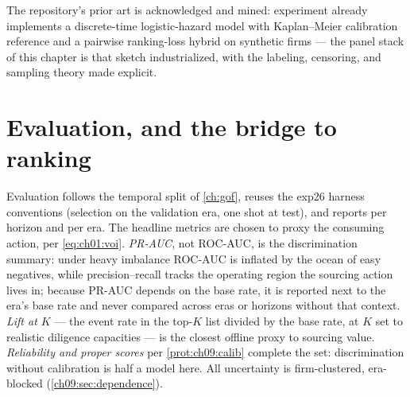 The repository's prior art is acknowledged and mined: experiment
 already implements a discrete-time logistic-hazard model
with Kaplan--Meier calibration reference and a pairwise ranking-loss
hybrid on synthetic firms --- the panel stack of this chapter is that
sketch industrialized, with the labeling, censoring, and sampling theory
made explicit.

\section{Evaluation, and the bridge to ranking}\label{ch09:sec:eval}

Evaluation follows the temporal split of \cref{ch:gof}, reuses the exp26
harness conventions (selection on the validation era, one shot at test),
and reports per horizon and per era. The headline metrics are chosen to
proxy the consuming action, per \cref{eq:ch01:voi}. \emph{PR-AUC}, not
ROC-AUC, is the discrimination summary: under heavy imbalance ROC-AUC is
inflated by the ocean of easy negatives, while precision--recall tracks
the operating region the sourcing action lives in; because PR-AUC
depends on the base rate, it is reported next to the era's base rate
and never compared across eras or horizons without that context.
\emph{Lift at $K$} --- the event rate in the top-$K$ list divided by the
base rate, at $K$ set to realistic diligence capacities --- is the
closest offline proxy to sourcing value. \emph{Reliability and proper
scores} per \cref{prot:ch09:calib} complete the set: discrimination
without calibration is half a model here. All uncertainty is
firm-clustered, era-blocked (\cref{ch09:sec:dependence}).

